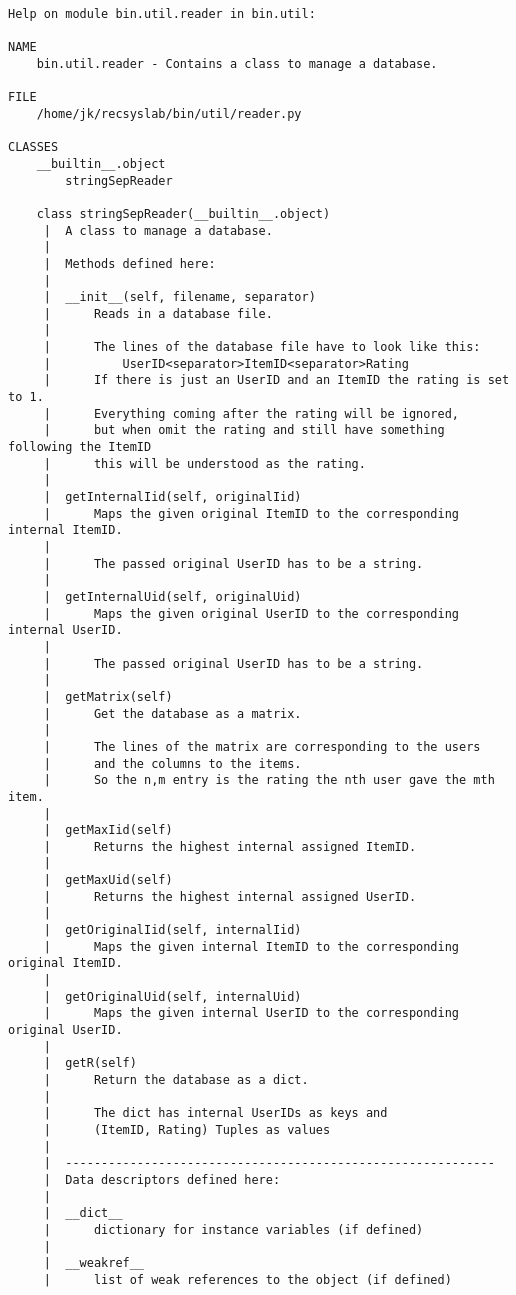 \begin{lstlisting}[style=docstring]
Help on module bin.util.reader in bin.util:

NAME
    bin.util.reader - Contains a class to manage a database.

FILE
    /home/jk/recsyslab/bin/util/reader.py

CLASSES
    __builtin__.object
        stringSepReader
    
    class stringSepReader(__builtin__.object)
     |  A class to manage a database.
     |  
     |  Methods defined here:
     |  
     |  __init__(self, filename, separator)
     |      Reads in a database file.
     |      
     |      The lines of the database file have to look like this:
     |          UserID<separator>ItemID<separator>Rating
     |      If there is just an UserID and an ItemID the rating is set to 1.
     |      Everything coming after the rating will be ignored,
     |      but when omit the rating and still have something following the ItemID
     |      this will be understood as the rating.
     |  
     |  getInternalIid(self, originalIid)
     |      Maps the given original ItemID to the corresponding internal ItemID.
     |      
     |      The passed original UserID has to be a string.
     |  
     |  getInternalUid(self, originalUid)
     |      Maps the given original UserID to the corresponding internal UserID.
     |      
     |      The passed original UserID has to be a string.
     |  
     |  getMatrix(self)
     |      Get the database as a matrix.
     |      
     |      The lines of the matrix are corresponding to the users
     |      and the columns to the items.
     |      So the n,m entry is the rating the nth user gave the mth item.
     |  
     |  getMaxIid(self)
     |      Returns the highest internal assigned ItemID.
     |  
     |  getMaxUid(self)
     |      Returns the highest internal assigned UserID.
     |  
     |  getOriginalIid(self, internalIid)
     |      Maps the given internal ItemID to the corresponding original ItemID.
     |  
     |  getOriginalUid(self, internalUid)
     |      Maps the given internal UserID to the corresponding original UserID.
     |  
     |  getR(self)
     |      Return the database as a dict.
     |      
     |      The dict has internal UserIDs as keys and
     |      (ItemID, Rating) Tuples as values
     |  
     |  ------------------------------------------------------------
     |  Data descriptors defined here:
     |  
     |  __dict__
     |      dictionary for instance variables (if defined)
     |  
     |  __weakref__
     |      list of weak references to the object (if defined)
\end{lstlisting}

